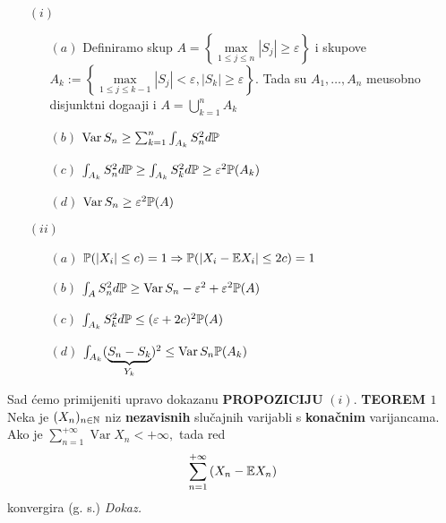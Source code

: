 \documentclass{article}
\newcommand{\Var}{\operatorname{Var}}
\begin{document}
\begin{enumerate}
    \item[\((i)\)]\begin{enumerate}
        \item[\((a)\)] Definiramo skup \(A=\left\{\max\limits_{1\le j\le n}|S_j|\ge\varepsilon\right\}\) i skupove \(A_k:=\left\{\max\limits_{1\le j\le k-1}|S_j|<\varepsilon,|S_k|\ge\varepsilon\right\}.\) Tada su \(A_1,\ldots, A_n\) me\dj{}usobno disjunktni doga\dj{}aji i \(A=\displaystyle\bigcup_{k=1}^nA_k\)
        \item[\((b)\)] \(\Var S_n\ge\sum_{k=1}^n\int_{A_k}S_n^2d\Bbb P\)
        \item[\((c)\)] \(\int_{A_k}S_n^2d\Bbb P\ge\int_{A_k}S_k^2d\Bbb P\ge\varepsilon^2\Bbb P(A_k)\)
        \item[\((d)\)] \(\Var S_n\ge\varepsilon^2\Bbb P(A)\)
    \end{enumerate}
    \item[\((ii)\)]\begin{enumerate}
        \item[\((a)\)] \(\Bbb P(|X_i|\le c)=1\Rightarrow\Bbb P(|X_i-\Bbb EX_i|\le 2c)=1
        \)
        \item[\((b)\)] \(\int_A S_n^2d\Bbb P\ge\Var S_n-\varepsilon^2+\varepsilon^2\Bbb P(A)\)
        \item[\((c)\)] \(\int_{A_k}S_k^2d\Bbb P\le(\varepsilon+2c)^2\Bbb P(A)\)
        \item[\((d)\)] \(\int_{A_k}(\underbrace{S_n-S_k}_{Y_k})^2\le\Var S_n\Bbb P(A_k)\)
    \end{enumerate}
\end{enumerate}
Sad ćemo primijeniti upravo dokazanu \textbf{PROPOZICIJU} \((i).\)\newline
\textbf{TEOREM \(1\)}\newline Neka je \((X_n)_{n\in\Bbb N}\) niz \textbf{nezavisnih} slučajnih varijabli s \textbf{konačnim} varijancama. Ako je \(\displaystyle\sum_{n=1}^{+\infty}\Var X_n<+\infty,\) tada red \[\sum_{n=1}^{+\infty}\left(X_n-\Bbb EX_n\right)\] konvergira (g. s.)\newline\newline
\textit{Dokaz.}\newline
\end{document}
